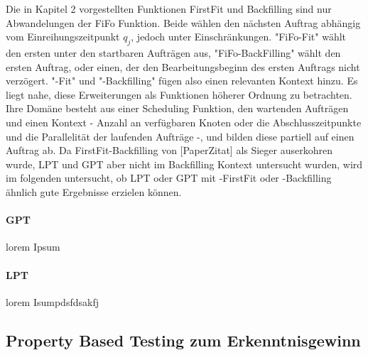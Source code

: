 Die in Kapitel 2 vorgestellten Funktionen FirstFit und Backfilling sind nur Abwandelungen der FiFo Funktion. Beide wählen den nächsten Auftrag abhängig vom Einreihungszeitpunkt $q_j$, jedoch unter Einschränkungen. "FiFo-Fit" wählt den ersten unter den startbaren Aufträgen aus, "FiFo-BackFilling" wählt den ersten Auftrag, oder einen, der den Bearbeitungsbeginn des ersten Auftrags nicht verzögert. "-Fit" und "-Backfilling" fügen also einen relevanten Kontext hinzu. Es liegt nahe, diese Erweiterungen als Funktionen höherer Ordnung zu betrachten. Ihre Domäne besteht aus einer Scheduling Funktion, den wartenden Aufträgen und einen Kontext - Anzahl an verfügbaren Knoten oder die Abschlusszeitpunkte und die Parallelität der laufenden Aufträge -, und bilden diese partiell auf einen Auftrag ab. 
Da FirstFit-Backfilling von [PaperZitat] als Sieger auserkohren wurde, LPT und GPT aber nicht im Backfilling Kontext untersucht wurden, wird im folgenden untersucht, ob LPT oder GPT mit -FirstFit oder -Backfilling ähnlich gute Ergebnisse erzielen können.

\paragraph{GPT}
lorem Ipsum

\paragraph{LPT}
lorem Isumpdsfdsakfj



\subsection{Property Based Testing zum Erkenntnisgewinn}
\label{proptest}
